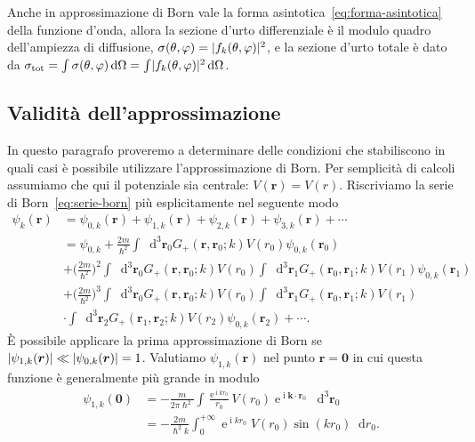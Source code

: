 \documentclass[a4paper,fleqn,twoside,12pt]{article}
\renewcommand{\phi}{\varphi}
\newcommand*{\dd}{\mathop{}\!\mathrm{d}} %
\DeclareMathOperator{\e}{\mathrm{e}} %
\DeclareMathOperator{\uimm}{\mathrm{i}} %
\DeclarePairedDelimiter{\abs}{\lvert}{\rvert}
\begin{document}
Anche in approssimazione di Born vale la forma
asintotica~\eqref{eq:forma-asintotica} della funzione d'onda, allora la sezione
d'urto differenziale è il modulo quadro dell'ampiezza di diffusione,
$\sigma(\theta,\phi) = \abs{f_{k}(\theta,\phi)}^{2}$, e la sezione d'urto totale
è dato da
$\sigma_{\textup{tot}} = \int \sigma(\theta,\phi) \dd\Omega = \int
\abs{f_{k}(\theta,\phi)}^{2} \dd\Omega$.

\subsection{Validità dell'approssimazione}
\label{sec:validita-born}

In questo paragrafo proveremo a determinare delle condizioni che stabiliscono in
quali casi è possibile utilizzare l'approssimazione di Born.  Per semplicità di
calcoli assumiamo che qui il potenziale sia centrale: $V(\bm{r}) = V(r)$.
Riscriviamo la serie di Born~\eqref{eq:serie-born} più esplicitamente nel
seguente modo
\begin{equation}
  \label{eq:serie-born-esplicita}
  \begin{split}
    \psi_{k}(\bm{r}) &= \psi_{0,k}(\bm{r}) + \psi_{1,k}(\bm{r}) +
    \psi_{2,k}(\bm{r}) + \psi_{3,k}(\bm{r}) + \cdots \\
    &=\psi_{0,k} + \frac{2 m}{\hslash^{2}}\int\dd^{3}\bm{r}_{0}
    G_{+}(\bm{r},\bm{r}_{0};k) V(r_{0}) \psi_{0,k}(\bm{r}_{0}) \\
    &+ \bigg(\frac{2m}{\hslash^{2}}\bigg)^{2}
    \int\dd^{3}\bm{r}_{0}G_{+}(\bm{r},\bm{r}_{0};k)
    V(r_{0})\int\dd^{3}\bm{r}_{1} G_{+}(\bm{r}_{0},\bm{r}_{1};k) V(r_{1})
    \psi_{0,k}(\bm{r}_{1}) \\
    &+ \bigg(\frac{2m}{\hslash^{2}}\bigg)^{3}
    \int\dd^{3}\bm{r}_{0}G_{+}(\bm{r},\bm{r}_{0};k)
    V(r_{0})\int\dd^{3}\bm{r}_{1} G_{+}(\bm{r}_{0},\bm{r}_{1};k) V(r_{1}) \\
    &\cdot\int\dd^{3}\bm{r}_{2} G_{+}(\bm{r}_{1},\bm{r}_{2};k) V(r_{2})
    \psi_{0,k}(\bm{r}_{2}) + \cdots.
  \end{split}
\end{equation}
È possibile applicare la prima approssimazione di Born se
$\abs{\psi_{1,k}(\bm{r})} \ll \abs{\psi_{0,k}(\bm{r})} = 1$.  Valutiamo
$\psi_{1,k}(\bm{r})$ nel punto $\bm{r} = \bm{0}$ in cui questa funzione è
generalmente più grande in modulo
\begin{equation}
  \label{eq:foobar}
  \begin{split}
    \psi_{1,k}(\bm{0}) &= -\frac{m}{2\pi\hslash^{2}}\int \frac{\e^{\uimm
        kr_{0}}}{r_{0}} V(r_{0}) \e^{\uimm \bm{k}\cdot\bm{r}_{0}}
    \dd^{3}\bm{r}_{0} \\
    &= -\frac{2m}{\hslash^{2}k} \int_{0}^{+\infty} \e^{\uimm kr_{0}}V(r_{0})
    \sin(kr_{0}) \dd r_{0}.
  \end{split}
\end{equation}
\end{document}
